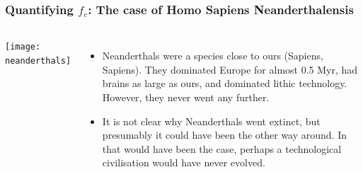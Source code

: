 % 
%
%
%


\begin{frame}
\frametitle{Quantifying $f_{c}$: The case of Homo Sapiens Neanderthalensis}

\begin{columns}

\texttt{[image: neanderthals]}


 \begin{itemize}
\item
Neanderthals were a species close to ours (Sapiens, Sapiens). They dominated Europe for almost 0.5 Myr, had brains as large as ours, and dominated lithic technology. However, they never went any further. 
\item It is not clear why Neanderthals went extinct, but presumably it could have been the other way around. In that would have been the case, perhaps a technological civilisation would have never evolved. 
\end{itemize}


\end{columns}
\end{frame}

